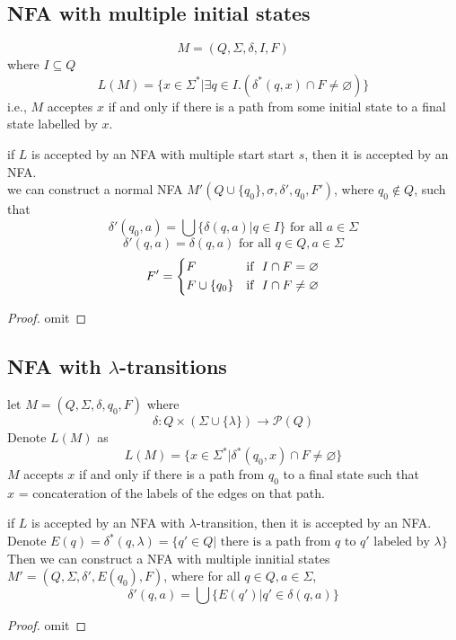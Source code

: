 \documentclass{aq-notes}
\begin{document}
\subsection{NFA with multiple initial states}
\[M= (Q,\Sigma, \delta, I, F)\]
where $I\subseteq Q$
\[L(M) = \{x\in \Sigma^*|\exists q\in I.(\delta^*(q,x)\cap F\neq \varnothing)\}\]
i.e., $M$ acceptes $x$ if and only if there is a path from some initial state to a final state labelled by $x$.
\begin{corollary}
    if $L$ is accepted by an NFA with multiple start start $s$, then it is accepted by an NFA.\\
    we can construct a normal NFA $M'(Q\cup \{q_0\},\sigma, \delta',q_0, F' )$, where $q_0\not \in Q$, such that
    \[\delta'(q_0,a) = \bigcup\{\delta(q,a)|q\in I\} \mbox{ for all $a\in \Sigma$}\]
    \[\delta'(q,a) = \delta(q,a)\mbox{ for all $q\in Q, a\in \Sigma$}\]
    \begin{equation*}
        F' = \left\{\begin{aligned}
            &F &\mbox{\normalfont if }\ I\cap F = \varnothing\\
            &F\cup\{q_0\} &\mbox{\normalfont if }\ I\cap F\neq \varnothing
        \end{aligned}
            \right.
    \end{equation*}
    \begin{proof}
        omit
    \end{proof}
\end{corollary}
\subsection{NFA with $\lambda$-transitions}
let $M= (Q,\Sigma, \delta, q_0, F)$ where \[\delta: Q\times (\Sigma\cup \{\lambda\}) \to \mathcal{P}(Q)\]
Denote $L(M)$ as
\[L(M) = \{x\in \Sigma^*|\delta^*(q_0,x)\cap F \neq \varnothing\}\]
$M$ accepts $x$ if and only if there is a path from $q_0$ to a final state such that\\ 
$x$ = concateration of the labels of the edges on that path.
\begin{corollary}
    if $L$ is accepted by an NFA with $\lambda$-transition, then it is accepted by an NFA.\\
    Denote $E(q) = \delta^*(q,\lambda) = \{q'\in Q|\mbox{ there is a path from $q$ to $q'$ labeled by $\lambda$}\}$\\
    Then we can construct a NFA with multiple innitial states $M'=(Q,\Sigma, \delta', E(q_0), F)$, where for all $q\in Q, a\in \Sigma$, 
    \[\delta'(q,a) = \bigcup\{E(q')|q'\in \delta(q,a)\}\]
    \begin{proof}
        omit
    \end{proof}
\end{corollary}
\end{document}
